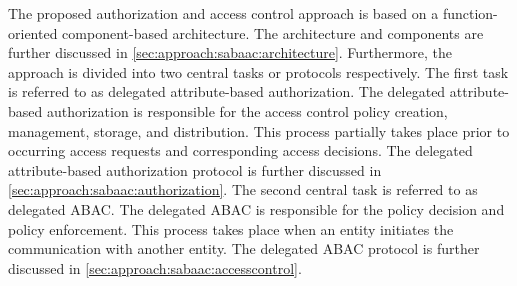The proposed authorization and access control approach is based on a function-oriented component-based architecture.
The architecture and components are further discussed in \autoref{sec:approach:sabaac:architecture}.
Furthermore, the approach is divided into two central tasks or protocols respectively.
The first task is referred to as delegated attribute-based authorization.
The delegated attribute-based authorization is responsible for the access control policy creation, management, storage, and distribution.
This process partially takes place prior to occurring access requests and corresponding access decisions.
The delegated attribute-based authorization protocol is further discussed in \autoref{sec:approach:sabaac:authorization}.
The second central task is referred to as delegated ABAC.
The delegated ABAC is responsible for the policy decision and policy enforcement.
This process takes place when an entity initiates the communication with another entity.
The delegated ABAC protocol is further discussed in \autoref{sec:approach:sabaac:accesscontrol}.

